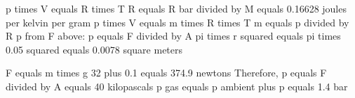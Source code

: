 p times V equals R times T  
R equals R bar divided by M equals 0.16628 joules per kelvin per gram  
p times V equals m times R times T  
m equals p divided by R  
p from F above: p equals F divided by A  
pi times r squared equals pi times 0.05 squared equals 0.0078 square meters  

F equals m times g  
32 plus 0.1 equals 374.9 newtons  
Therefore, p equals F divided by A equals 40 kilopascals  
p gas equals p ambient plus p equals 1.4 bar